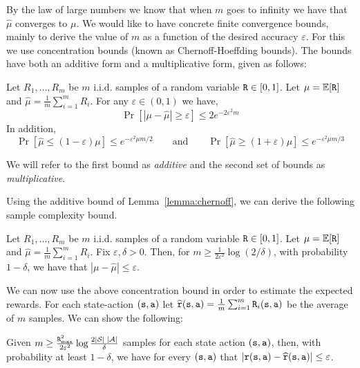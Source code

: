 By the law of large numbers we know that when $m$ goes to infinity
we have that $\widehat{\mu}$ converges to $\mu$. We would like to
have concrete finite convergence bounds, mainly to derive the value
of $m$ as a function of the desired accuracy $\varepsilon$.
%
For this we use concentration bounds (known as Chernoff-Hoeffding
bounds). The bounds have both an additive form and a multiplicative
form, given as follows:
\begin{lemma}
\label{lemma:chernoff}
%
Let $R_1, \ldots, R_m$ be $m$ i.i.d. samples of a random variable
${\tt R}\in[0,1]$. Let $\mu=\mathbb{E}[{\tt R}]$ and
$\widehat{\mu}=\frac{1}{m}\sum_{i=1}^m R_i$. For any
$\varepsilon\in(0,1)$ we have,
\[
\Pr[|\mu-\widehat{\mu}|\geq \varepsilon]\leq 2e^{-2\varepsilon^2 m}
\]
In addition, %
\[
\Pr[\widehat{\mu}\leq (1-\varepsilon)\mu]\leq e^{-\varepsilon^2 \mu m
/2}\qquad \mbox{and}\qquad
 \Pr[\widehat{\mu}\geq
(1+\varepsilon)\mu]\leq e^{-\varepsilon^2 \mu m/3}
\]
\end{lemma}
We will refer to the first bound as {\em additive} and the second
set of bounds as {\em multiplicative}.

Using the additive bound of Lemma~\ref{lemma:chernoff}, we can derive the following sample complexity bound.
\begin{corollary}
\label{cor:chernoff}
 Let $R_1, \ldots, R_m$ be $m$
i.i.d. samples of a random variable ${\tt R}\in[0,1]$. Let
$\mu=\mathbb{E}[{\tt R}]$ and $\widehat{\mu}=\frac{1}{m}\sum_{i=1}^m R_i$.
Fix $\varepsilon,\delta>0$. Then, for $m\geq
\frac{1}{2\varepsilon^2}\log (2/\delta)$, with probability
$1-\delta$, we have that $|\mu-\widehat{\mu}|\leq \varepsilon$.
\end{corollary}


We can now use the above concentration bound in order to estimate
the expected rewards. For each state-action $({\tt s},{\tt a})$ let
$\widehat{{\tt r}}({\tt s},{\tt a})=\frac{1}{m}\sum_{i=1}^m
{\tt R}_i({\tt s},{\tt a})$ be the average of $m$ samples. We can
show the following:

\begin{claim}
\label{claim:sample}
%
Given $m\geq \frac{{\tt R}_{\max }^2}{2\varepsilon^2}\log \frac{2|\mathcal{S}|
\;|\mathcal{A}|}{\delta}$ samples for each state action
$({\tt s},{\tt a})$, then, with probability at least $1-\delta$, we have for
every $({\tt s},{\tt a})$ that
$|{\tt r}({\tt s},{\tt a})-\widehat{{\tt r}}({\tt s},{\tt a})|\leq
\varepsilon$.
\end{claim}

